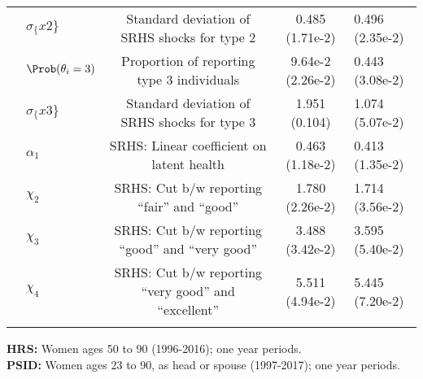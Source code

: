 \begin{table}[H]
\begin{center}
{\begin{tabular}{clcc}
 & $\sigma_\{x2\}$ & Standard deviation of SRHS shocks for type 2 & 0.485 (1.71e-2) & 0.496 (2.35e-2) \\
 & $\Prob(\theta_i=3)$ & Proportion of reporting type 3 individuals & 9.64e-2 (2.26e-2) & 0.443 (3.08e-2) \\
 & $\sigma_\{x3\}$ & Standard deviation of SRHS shocks for type 3 & 1.951 (0.104) & 1.074 (5.07e-2) \\
 & $\alpha_1$ & SRHS: Linear coefficient on latent health & 0.463 (1.18e-2) & 0.413 (1.35e-2) \\
 & $\chi_2$ & SRHS: Cut b/w reporting ``fair'' and ``good'' & 1.780 (2.26e-2) & 1.714 (3.56e-2) \\
 & $\chi_3$ & SRHS: Cut b/w reporting ``good'' and ``very good'' & 3.488 (3.42e-2) & 3.595 (5.40e-2) \\
 & $\chi_4$ & SRHS: Cut b/w reporting ``very good'' and ``excellent'' & 5.511 (4.94e-2) & 5.445 (7.20e-2) \\
 & \hline\hline
\end{tabular}
 } 
 \usebox{\WomenParamsXXXBox}  
\settowidth\TableWidth{\usebox{\WomenParamsXXXBox}} %
\vspace{0.0cm} \parbox{\TableWidth}{
  \begin{flushleft}
\textbf{HRS:} Women ages 50 to 90 (1996-2016); one year periods.\\
\textbf{PSID:} Women ages 23 to 90, as head or spouse (1997-2017); one year periods.\\
  \end{flushleft}
}
\end{center}
\end{table}
